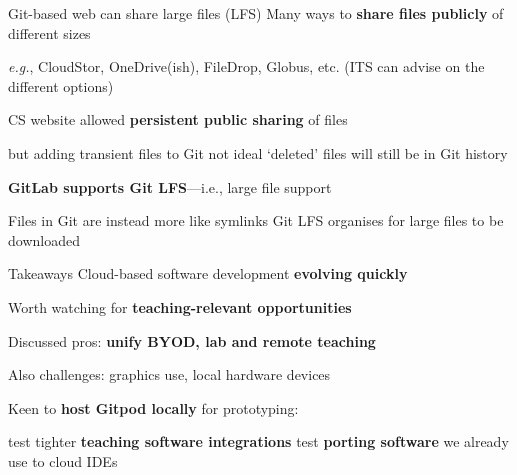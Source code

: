 \documentclass[aspectratio=169,t]{beamer}
\begin{document}
\begin{dframe}{Git-based web can share large files (LFS)}
  \1 Many ways to \textbf{share files publicly} of different sizes

  \2 \emph{e.g.}, CloudStor, OneDrive(ish), FileDrop, Globus, etc.
  \2 (ITS can advise on the different options)

  \1 CS website allowed \textbf{persistent public sharing} of files

  \2 but adding transient files to Git not ideal
  \2 `deleted' files will still be in Git history

  \1 \textbf{GitLab supports Git LFS}---i.e., large file support

  \2 Files in Git are instead more like symlinks
  \2 Git LFS organises for large files to be downloaded

\end{dframe}

\begin{dframe}{Takeaways}
  \1 Cloud-based software development \textbf{evolving quickly}

  \2 Worth watching for \textbf{teaching-relevant opportunities}

  \medskip
  
  \1 Discussed pros: \textbf{unify BYOD, lab and remote teaching}

  \medskip
  
  \1 Also challenges: graphics use, local hardware devices

  \medskip
  
  \1 Keen to \textbf{host Gitpod locally} for prototyping:
  
  \2 test tighter \textbf{teaching software integrations}
  \2 test \textbf{porting software} we already use to cloud IDEs

\end{dframe}

\begin{comment}
\begin{dframe}{FaaS, serverless and responsiveness}
  \1 Edge appearance
\end{dframe}
\end{comment}
\end{document}
